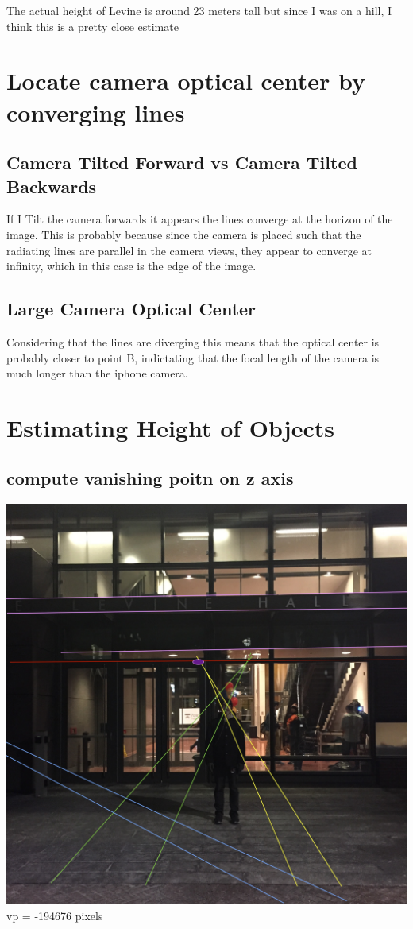 \documentclass[11pt,english]{article}
\begin{document}
The actual height of Levine is around 23 meters tall but since I was on a hill, I think this is a pretty close estimate 


\section*{Locate camera optical center by converging lines}
\subsection*{Camera Tilted Forward vs Camera Tilted Backwards}
If I Tilt the camera forwards it appears the lines converge at the horizon of the image. This is probably because since the camera is placed such that the radiating lines are parallel in the camera views, they appear to converge at infinity, which in this case is the edge of the image. 
\subsection*{Large Camera Optical Center}
Considering that the lines are diverging this means that the optical center is probably closer to point B, indictating that the focal length of the camera is much longer than the iphone camera. 

\section*{Estimating Height of Objects}
\subsection*{compute vanishing poitn on z axis} 
\includegraphics[width = \linewidth]{IMG_2525.jpg}
	vp =  -194676 pixels
\end{document}
